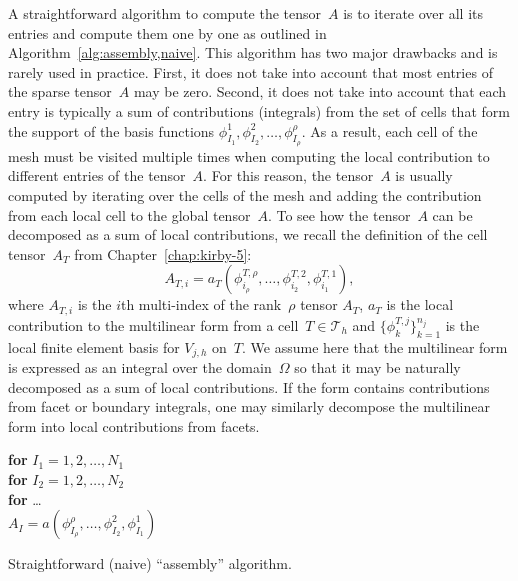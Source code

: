 A straightforward algorithm to compute the tensor~$A$ is to iterate
over all its entries and compute them one by one as outlined in
Algorithm~\ref{alg:assembly,naive}. This algorithm has two major
drawbacks and is rarely used in practice. First, it does not take into
account that most entries of the sparse tensor~$A$ may be
zero. Second, it does not take into account that each entry is
typically a sum of contributions (integrals) from the set of cells
that form the support of the basis functions $\phi^1_{I_1},
\phi^2_{I_2}, \ldots, \phi^{\rho}_{I_\rho}$. As a result, each cell of
the mesh must be visited multiple times when computing the local
contribution to different entries of the tensor~$A$.  For this reason,
the tensor~$A$ is usually computed by iterating over the cells of the
mesh and adding the contribution from each local cell to the global
tensor~$A$. To see how the tensor~$A$ can be decomposed as a sum of
local contributions, we recall the definition of the cell tensor~$A_T$
from Chapter~\ref{chap:kirby-5}:
\begin{equation}
  A_{T,i} = a_T(\phi^{T,\rho}_{i_{\rho}}, \ldots, \phi^{T,2}_{i_2},
  \phi^{T,1}_{i_1}),
\end{equation}
where $A_{T,i}$ is the $i$th multi-index of the rank~$\rho$ tensor
$A_T$, $a_T$ is the local contribution to the multilinear form from a
cell~$T\in\mathcal{T}_h$ and $\{\phi^{T,j}_k\}_{k=1}^{n_j}$ is the
local finite element basis for $V_{j,h}$ on~$T$. We assume here that
the multilinear form is expressed as an integral over the
domain~$\Omega$ so that it may be naturally decomposed as a sum of
local contributions. If the form contains contributions from facet or
boundary integrals, one may similarly decompose the multilinear form
into local contributions from facets.

\begin{algorithm}
  \begin{tabbing}
    \textbf{for} {$I_1 = 1,2,\ldots,N_1$}\\
    \tab \textbf{for} {$I_2 = 1,2,\ldots,N_2$}\\
    \tab \tab \textbf{for} \ldots \\
    \tab \tab \tab $A_I = a(\phi^{\rho}_{I_{\rho}}, \ldots, \phi^2_{I_2}, \phi^1_{I_1})$
  \end{tabbing}
  \caption{Straightforward (naive) ``assembly'' algorithm.}
  \label{alg:assembly,naive}
\end{algorithm}

